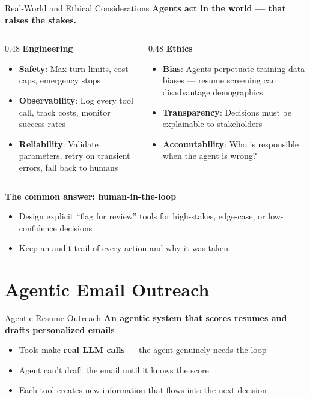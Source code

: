 \documentclass[aspectratio=169]{beamer}
\begin{document}
\begin{frame}{Real-World and Ethical Considerations}
\textbf{Agents act in the world --- that raises the stakes.}
\vspace{0.2cm}

\begin{columns}[T]
\begin{column}{0.48\textwidth}
\textbf{Engineering}
\begin{itemize}
    \item \textbf{Safety}: Max turn limits, cost caps, emergency stops
    \item \textbf{Observability}: Log every tool call, track costs, monitor success rates
    \item \textbf{Reliability}: Validate parameters, retry on transient errors, fall back to humans
\end{itemize}
\end{column}

\begin{column}{0.48\textwidth}
\textbf{Ethics}
\begin{itemize}
    \item \textbf{Bias}: Agents perpetuate training data biases --- resume screening can disadvantage demographics
    \item \textbf{Transparency}: Decisions must be explainable to stakeholders
    \item \textbf{Accountability}: Who is responsible when the agent is wrong?
\end{itemize}
\end{column}
\end{columns}

\vspace{0.4cm}
\textbf{The common answer: human-in-the-loop}
\begin{itemize}
    \item Design explicit ``flag for review'' tools for high-stakes, edge-case, or low-confidence decisions
    \item Keep an audit trail of every action and why it was taken
\end{itemize}
\end{frame}


\section{Agentic Email Outreach}

\begin{frame}{Agentic Resume Outreach}
\textbf{An agentic system that scores resumes and drafts personalized emails}
\begin{itemize}
	\item Tools make \textbf{real LLM calls} --- the agent genuinely needs the loop
	\item Agent can't draft the email until it knows the score
	\item Each tool creates new information that flows into the next decision
\end{itemize}
\vspace{0.3cm}

\end{frame}
\end{document}
